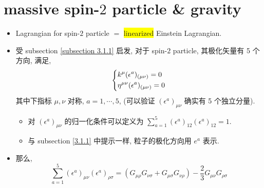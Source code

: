 \section{massive spin-\texorpdfstring{$2$}{2} particle \& gravity}
\begin{itemize}
	\item Lagrangian for spin-$2$ particle $=$ \colorbox{yellow}{linearized} Einstein Lagrangian.
	
	\item 受 subsection \ref{subsection 3.1.1} 启发, 对于 spin-$2$ particle, 其极化矢量有 5 个方向, 满足,
	\begin{equation} \label{3.2.1}
		\begin{dcases}
			k^\mu (\epsilon^a)_{(\mu \nu)} = 0 \\
			\eta^{\mu \nu} (\epsilon^a)_{(\mu \nu)} = 0
		\end{dcases}
	\end{equation}
	其中下指标 $\mu, \nu$ 对称, $a = 1, \cdots, 5$, (可以验证 $(\epsilon^a)_{\mu \nu}$ 确实有 5 个独立分量).
	\begin{itemize}
		\item 对 $(\epsilon^{a})_{\mu \nu}$ 的归一化条件可以定义为 $\sum_{a = 1}^5 (\epsilon^a)_{1 2} (\epsilon^a)_{1 2} = 1$.
		
		\item 与 subsection \ref{3.1.1} 中提示一样, 粒子的极化方向用 $e^a$ 表示.
	\end{itemize}
	
	\item 那么,
	\begin{equation}
		\sum_{a = 1}^5 (\epsilon^a)_{\mu \nu} (\epsilon^a)_{\rho \sigma} = (G_{\mu \rho} G_{\nu \sigma} + G_{\mu \sigma} G_{\nu \rho}) - \frac{2}{3} G_{\mu \nu} G_{\rho \sigma}
	\end{equation}
	

\end{itemize}
